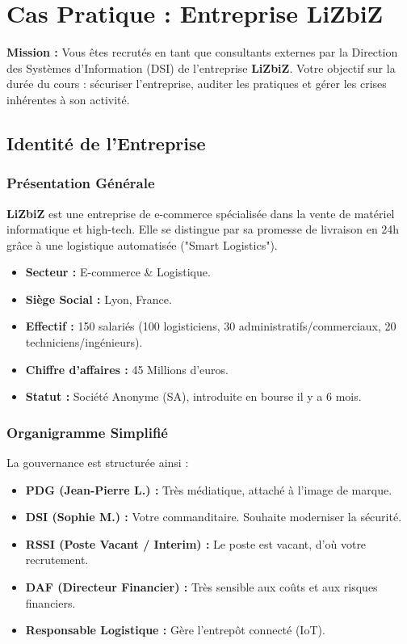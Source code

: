 \chapter{Cas Pratique : Entreprise LiZbiZ}
\label{chap:lizbiz}

\begin{boxlizbiz}
\textbf{Mission :} Vous êtes recrutés en tant que consultants externes par la Direction des Systèmes d'Information (DSI) de l'entreprise \textbf{LiZbiZ}. Votre objectif sur la durée du cours : sécuriser l'entreprise, auditer les pratiques et gérer les crises inhérentes à son activité.
\end{boxlizbiz}

\section{Identité de l'Entreprise}

\subsection{Présentation Générale}
\textbf{LiZbiZ} est une entreprise de e-commerce spécialisée dans la vente de matériel informatique et high-tech. Elle se distingue par sa promesse de livraison en 24h grâce à une logistique automatisée ("Smart Logistics").

\begin{itemize}
    \item \textbf{Secteur :} E-commerce \& Logistique.
    \item \textbf{Siège Social :} Lyon, France.
    \item \textbf{Effectif :} 150 salariés (100 logisticiens, 30 administratifs/commerciaux, 20 techniciens/ingénieurs).
    \item \textbf{Chiffre d'affaires :} 45 Millions d'euros.
    \item \textbf{Statut :} Société Anonyme (SA), introduite en bourse il y a 6 mois.
\end{itemize}

\subsection{Organigramme Simplifié}
La gouvernance est structurée ainsi :
\begin{itemize}
    \item \textbf{PDG (Jean-Pierre L.) :} Très médiatique, attaché à l'image de marque.
    \item \textbf{DSI (Sophie M.) :} Votre commanditaire. Souhaite moderniser la sécurité.
    \item \textbf{RSSI (Poste Vacant / Interim) :} Le poste est vacant, d'où votre recrutement.
    \item \textbf{DAF (Directeur Financier) :} Très sensible aux coûts et aux risques financiers.
    \item \textbf{Responsable Logistique :} Gère l'entrepôt connecté (IoT).
\end{itemize}

